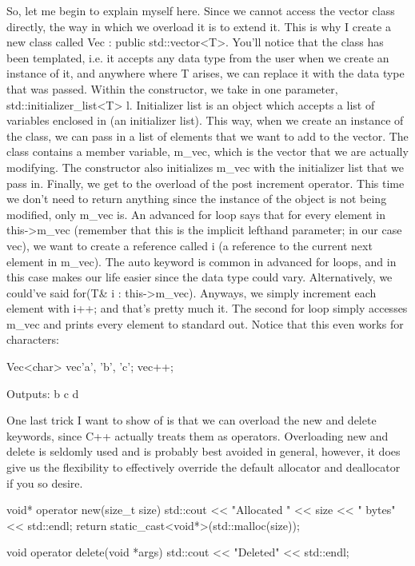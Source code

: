 \documentclass{article}
\begin{document}
So, let me begin to explain myself here. Since we cannot access the vector class directly, the way in which
we overload it is to extend it. This is why I create a new class called Vec : public std::vector<T>. You’ll
notice that the class has been templated, i.e. it accepts any data type from the user when we create an
instance of it, and anywhere where T arises, we can replace it with the data type that was passed. Within the
constructor, we take in one parameter, std::initializer\_list<T> l. Initializer list is an object which
accepts a list of variables enclosed in {} (an initializer list). This way, when we create an instance of the
class, we can pass in a list of elements that we want to add to the vector. The class contains a member
variable, m\_vec, which is the vector that we are actually modifying. The constructor also initializes m\_vec
with the initializer list that we pass in.  Finally, we get to the overload of the post increment operator.
This time we don’t need to return anything since the instance of the object is not being modified, only
m\_vec is. An advanced for loop says that for every element in this->m\_vec (remember that this is the
implicit lefthand parameter; in our case vec), we want to create a reference called i (a reference to the
current next element in m\_vec). The auto keyword is common in advanced for loops, and in this case makes our
life easier since the data type could vary. Alternatively, we could’ve said for(T\& i : this->m\_vec).
Anyways, we simply increment each element with i++; and that’s pretty much it. The second for loop simply
accesses m\_vec and prints every element to standard out. Notice that this even works for characters:

\begin{cpplst}

Vec<char> vec{'a', 'b', 'c'};
vec++;

\end{cpplst}

Outputs: b c d

One last trick I want to show of is that we can overload the new and delete keywords, since C++ actually
treats them as operators. Overloading new and delete is seldomly used and is probably best avoided in
general, however, it does give us the flexibility to effectively override the default allocator and
deallocator if you so desire.

\begin{cpplst}

void* operator new(size_t size)
{
    std::cout << "Allocated " << size << " bytes" << std::endl;
    return static_cast<void*>(std::malloc(size));
}

void operator delete(void *args)
{
    std::cout << "Deleted" << std::endl;
}

\end{cpplst}
\end{document}
